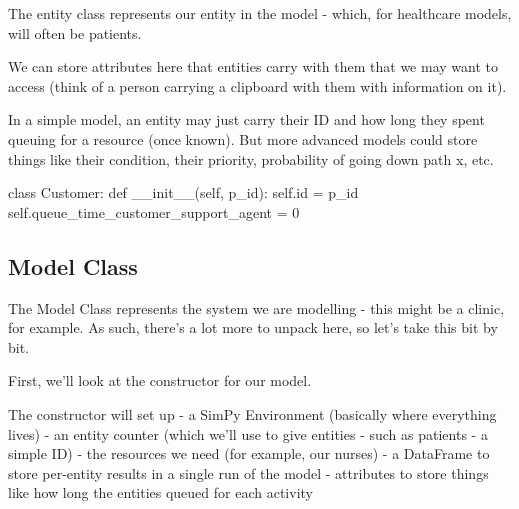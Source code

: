 \documentclass[
  letterpaper,
  DIV=11,
  numbers=noendperiod]{scrreprt}
\newenvironment{Shaded}{}{}
\newcommand{\BuiltInTok}[1]{\textcolor[rgb]{0.84,0.23,0.29}{#1}}
\newcommand{\DecValTok}[1]{\textcolor[rgb]{0.00,0.36,0.77}{#1}}
\newcommand{\FunctionTok}[1]{\textcolor[rgb]{0.44,0.26,0.76}{#1}}
\newcommand{\KeywordTok}[1]{\textcolor[rgb]{0.84,0.23,0.29}{#1}}
\newcommand{\NormalTok}[1]{\textcolor[rgb]{0.14,0.16,0.18}{#1}}
\newcommand{\OperatorTok}[1]{\textcolor[rgb]{0.14,0.16,0.18}{#1}}
\newcommand{\VariableTok}[1]{\textcolor[rgb]{0.89,0.38,0.04}{#1}}
\begin{document}
The entity class represents our entity in the model - which, for
healthcare models, will often be patients.

We can store attributes here that entities carry with them that we may
want to access (think of a person carrying a clipboard with them with
information on it).

In a simple model, an entity may just carry their ID and how long they
spent queuing for a resource (once known). But more advanced models
could store things like their condition, their priority, probability of
going down path x, etc.

\begin{tcolorbox}[enhanced jigsaw, colframe=quarto-callout-note-color-frame, bottomtitle=1mm, breakable, rightrule=.15mm, coltitle=black, colbacktitle=quarto-callout-note-color!10!white, opacityback=0, leftrule=.75mm, arc=.35mm, toptitle=1mm, title=\textcolor{quarto-callout-note-color}{\faInfo}\hspace{0.5em}{Example entity class}, titlerule=0mm, colback=white, toprule=.15mm, bottomrule=.15mm, left=2mm, opacitybacktitle=0.6]

\begin{Shaded}
\begin{Highlighting}[]
\KeywordTok{class}\NormalTok{ Customer:}
    \KeywordTok{def} \FunctionTok{\_\_init\_\_}\NormalTok{(}\VariableTok{self}\NormalTok{, p\_id):}
        \VariableTok{self}\NormalTok{.}\BuiltInTok{id} \OperatorTok{=}\NormalTok{ p\_id}
        \VariableTok{self}\NormalTok{.queue\_time\_customer\_support\_agent }\OperatorTok{=} \DecValTok{0}
\end{Highlighting}
\end{Shaded}

\end{tcolorbox}

\subsection{Model Class}\label{model-class}

The Model Class represents the system we are modelling - this might be a
clinic, for example. As such, there's a lot more to unpack here, so
let's take this bit by bit.

First, we'll look at the constructor for our model.

The constructor will set up - a SimPy Environment (basically where
everything lives) - an entity counter (which we'll use to give entities
- such as patients - a simple ID) - the resources we need (for example,
our nurses) - a DataFrame to store per-entity results in a single run of
the model - attributes to store things like how long the entities queued
for each activity
\end{document}
